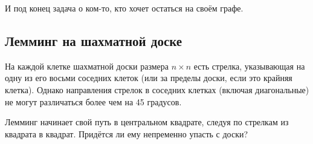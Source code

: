 \medskip

И под конец задача о ком-то, кто хочет остаться на своём графе.

\subsection*{Лемминг на шахматной доске}

На каждой клетке шахматной доски размера $n\times n$ есть стрелка, указывающая на одну из его восьми соседних клеток (или за пределы доски, если это крайняя клетка).
Однако направления стрелок в соседних клетках (включая диагональные) не могут различаться более чем на 45 градусов.

Лемминг начинает свой путь в центральном квадрате, следуя по стрелкам из квадрата в квадрат.
Придётся ли ему непременно упасть с доски?
